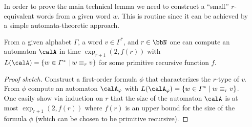 In order to prove the main technical lemma we need to construct a ``small'' $r$-equivalent words from a given word $w$. This is routine since it can be achieved by a simple automata-theoretic approach.
\begin{lemma}\label{lem:r-equiv_word_construction}
	From a given alphabet $\Gamma$, a word $v\in\Gamma^\ast$, and $r\in\bbN$ one can compute an automaton $\calA$ in time $\exp_{r+1}(2, f(r))$ with $L(\calA) = \{w\in \Gamma^\ast\mid w\equiv_r v \}$ for some primitive recursive function $f$.
\end{lemma}
\begin{proof}[Proof sketch]
	Construct a first-order formula $\phi$ that characterizes the $r$-type of $v$. From $\phi$ compute an automaton $\calA_\phi$ with $L(\calA_\phi) = \{ w\in\Gamma^\ast \mid w\equiv_r v \}$. One easily show via induction on $r$ that the size of the automaton $\calA$ is at most
	$\exp_{r+1}(2, f(r))$ where $f(r)$ is an upper bound for the size of the formula $\phi$ (which can be chosen to be primitive recursive).
\end{proof}



